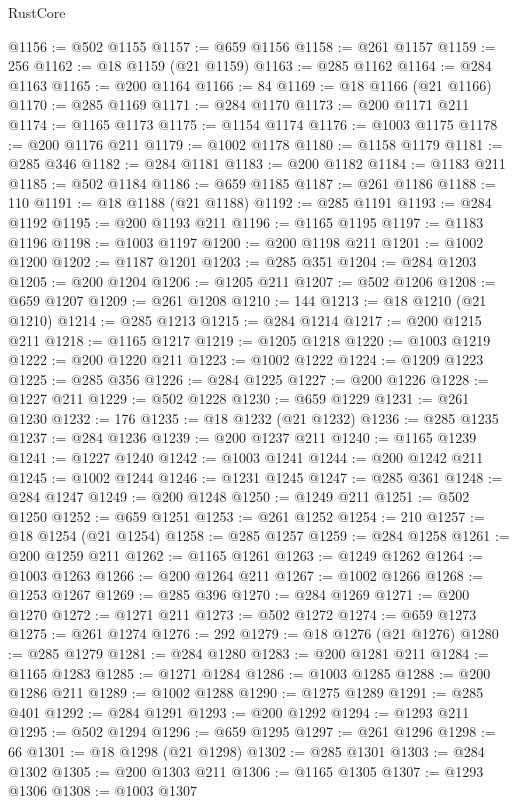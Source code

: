 \begin{lexlean}{RustCore}
\begin{coremodule}
@1156 := @502 @1155
@1157 := @659 @1156
@1158 := @261 @1157
@1159 := 256
@1162 := @18 @1159 (@21 @1159)
@1163 := @285 @1162
@1164 := @284 @1163
@1165 := @200 @1164
@1166 := 84
@1169 := @18 @1166 (@21 @1166)
@1170 := @285 @1169
@1171 := @284 @1170
@1173 := @200 @1171 @211
@1174 := @1165 @1173
@1175 := @1154 @1174
@1176 := @1003 @1175
@1178 := @200 @1176 @211
@1179 := @1002 @1178
@1180 := @1158 @1179
@1181 := @285 @346
@1182 := @284 @1181
@1183 := @200 @1182
@1184 := @1183 @211
@1185 := @502 @1184
@1186 := @659 @1185
@1187 := @261 @1186
@1188 := 110
@1191 := @18 @1188 (@21 @1188)
@1192 := @285 @1191
@1193 := @284 @1192
@1195 := @200 @1193 @211
@1196 := @1165 @1195
@1197 := @1183 @1196
@1198 := @1003 @1197
@1200 := @200 @1198 @211
@1201 := @1002 @1200
@1202 := @1187 @1201
@1203 := @285 @351
@1204 := @284 @1203
@1205 := @200 @1204
@1206 := @1205 @211
@1207 := @502 @1206
@1208 := @659 @1207
@1209 := @261 @1208
@1210 := 144
@1213 := @18 @1210 (@21 @1210)
@1214 := @285 @1213
@1215 := @284 @1214
@1217 := @200 @1215 @211
@1218 := @1165 @1217
@1219 := @1205 @1218
@1220 := @1003 @1219
@1222 := @200 @1220 @211
@1223 := @1002 @1222
@1224 := @1209 @1223
@1225 := @285 @356
@1226 := @284 @1225
@1227 := @200 @1226
@1228 := @1227 @211
@1229 := @502 @1228
@1230 := @659 @1229
@1231 := @261 @1230
@1232 := 176
@1235 := @18 @1232 (@21 @1232)
@1236 := @285 @1235
@1237 := @284 @1236
@1239 := @200 @1237 @211
@1240 := @1165 @1239
@1241 := @1227 @1240
@1242 := @1003 @1241
@1244 := @200 @1242 @211
@1245 := @1002 @1244
@1246 := @1231 @1245
@1247 := @285 @361
@1248 := @284 @1247
@1249 := @200 @1248
@1250 := @1249 @211
@1251 := @502 @1250
@1252 := @659 @1251
@1253 := @261 @1252
@1254 := 210
@1257 := @18 @1254 (@21 @1254)
@1258 := @285 @1257
@1259 := @284 @1258
@1261 := @200 @1259 @211
@1262 := @1165 @1261
@1263 := @1249 @1262
@1264 := @1003 @1263
@1266 := @200 @1264 @211
@1267 := @1002 @1266
@1268 := @1253 @1267
@1269 := @285 @396
@1270 := @284 @1269
@1271 := @200 @1270
@1272 := @1271 @211
@1273 := @502 @1272
@1274 := @659 @1273
@1275 := @261 @1274
@1276 := 292
@1279 := @18 @1276 (@21 @1276)
@1280 := @285 @1279
@1281 := @284 @1280
@1283 := @200 @1281 @211
@1284 := @1165 @1283
@1285 := @1271 @1284
@1286 := @1003 @1285
@1288 := @200 @1286 @211
@1289 := @1002 @1288
@1290 := @1275 @1289
@1291 := @285 @401
@1292 := @284 @1291
@1293 := @200 @1292
@1294 := @1293 @211
@1295 := @502 @1294
@1296 := @659 @1295
@1297 := @261 @1296
@1298 := 66
@1301 := @18 @1298 (@21 @1298)
@1302 := @285 @1301
@1303 := @284 @1302
@1305 := @200 @1303 @211
@1306 := @1165 @1305
@1307 := @1293 @1306
@1308 := @1003 @1307

\end{coremodule}
\end{lexlean}
